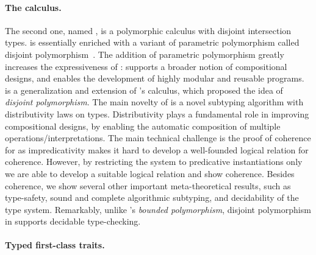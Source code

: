 \paragraph{The \fnamee calculus.}

The second one, named \fnamee, is a polymorphic calculus with disjoint
intersection types. \fnamee is essentially \namee enriched with a variant of
parametric polymorphism called disjoint polymorphism~\citep{alpuimdisjoint}. The
addition of parametric polymorphism greatly increases the expressiveness of
\namee: \fnamee supports a broader notion of compositional designs, and enables
the development of highly modular and reusable programs. \fnamee is a
generalization and extension of \citeauthor{alpuimdisjoint}'s \fname calculus, which proposed
the idea of \emph{disjoint polymorphism}. The main novelty of \fnamee is a novel
subtyping algorithm with distributivity laws on types. Distributivity plays a
fundamental role in improving compositional designs, by enabling the automatic
composition of multiple operations/interpretations. The main technical challenge
is the proof of coherence for \fnamee as impredicativity makes it hard to
develop a well-founded logical relation for coherence. However, by restricting
the system to predicative instantiations only we are able to develop a suitable
logical relation and show coherence.
Besides coherence, we show
several other important meta-theoretical results, such as type-safety,
sound and complete algorithmic subtyping, and
decidability of the type system. Remarkably, unlike
\fsub's \emph{bounded polymorphism}, disjoint polymorphism
in \fnamee supports decidable type-checking.



\paragraph{Typed first-class traits.}

